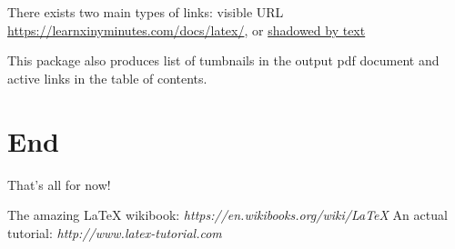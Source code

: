 \documentclass[12pt]{article}
\begin{document}
There exists two main types of links: visible URL \\
\url{https://learnxinyminutes.com/docs/latex/}, or  
\href{https://learnxinyminutes.com/docs/latex/}{shadowed by text}

This package also produces list of tumbnails in the output pdf document and 
active links in the table of contents.

\section{End}

That's all for now!

\begin{thebibliography}{1}
   The amazing \LaTeX \hspace{1pt} wikibook: {\em 
https://en.wikibooks.org/wiki/LaTeX}
   An actual tutorial: {\em http://www.latex-tutorial.com}
\end{thebibliography}

\end{document}
